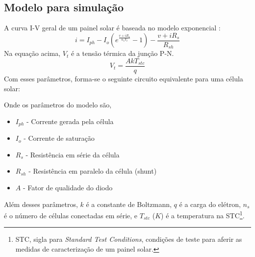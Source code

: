 \subsection*{Modelo para simulação}
A curva I-V geral de um painel solar é baseada no modelo exponencial \cite{pv_datasheet}:
\begin{equation}
    i = I_{ph} - I_{o}(e^{\frac{v + iR_{s}}{n_{s}V_{t}}}-1) - \frac{v + iR_{s}}{R_{sh}}
\end{equation}
Na equação acima, $V_{t}$ é a tensão térmica da junção P-N.
\begin{equation}
    V_{t} = \frac{AkT_{stc}}{q}
\end{equation}
Com esses parâmetros, forma-se o seguinte circuito equivalente para uma célula solar:
\noindent
\begin{minipage}{\linewidth}
\label{PV_equivalent_circuit_fig}
\end{minipage}
Onde os parâmetros do modelo são,
\begin{itemize}
    \item $I_{ph}$ - Corrente gerada pela célula
    \item $I_{o}$ - Corrente de saturação
    \item $R_{s}$ - Resistência em série da célula
    \item $R_{sh}$ - Resistência em paralelo da célula (shunt)
    \item $A$ - Fator de qualidade do diodo
\end{itemize}
Além desses parâmetros, $k$ é a constante de Boltzmann, $q$ é a carga do elétron, $n_{s}$ é o número de células conectadas em série, e $T_{stc}$ ($K$) é a temperatura na STC\footnote{STC, sigla para \textit{Standard Test Conditions}, condições de teste para aferir as medidas de caracterização de um painel solar.}.

